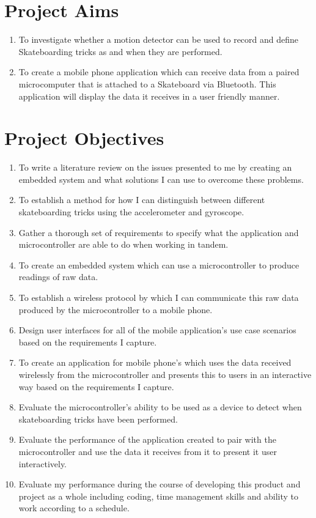 \section{Project Aims}\label{tor:projectaims}
\begin{enumerate}
\item To investigate whether a motion detector can be used to record and define Skateboarding tricks as and when they are performed.
\item To create a mobile phone application which can receive data from a paired microcomputer that is attached to a Skateboard via Bluetooth. This application will display the data it receives in a user friendly manner.
\end{enumerate}

\section{Project Objectives}\label{tor:projectobjectives}
\begin{enumerate}
\item To write a literature review on the issues presented to me by creating an embedded system and what solutions I can use to overcome these problems. 
\item To establish a method for how I can distinguish between different skateboarding tricks using the accelerometer and gyroscope.
\item Gather a thorough set of requirements to specify what the application and microcontroller are able to do when working in tandem. 
\item To create an embedded system which can use a microcontroller to produce readings of raw data. 
\item To establish a wireless protocol by which I can communicate this raw data produced by the microcontroller to a mobile phone. 
\item Design user interfaces for all of the mobile application’s use case scenarios based on the requirements I capture.
\item To create an application for mobile phone’s which uses the data received wirelessly from the microcontroller and presents this to users in an interactive way based on the requirements I capture. 
\item Evaluate the microcontroller’s ability to be used as a device to detect when skateboarding tricks have been performed. 
\item Evaluate the performance of the application created to pair with the microcontroller and use the data it receives from it to present it user interactively. 
\item Evaluate my performance during the course of developing this product and project as a whole including coding, time management skills and ability to work according to a schedule.
\end{enumerate}

